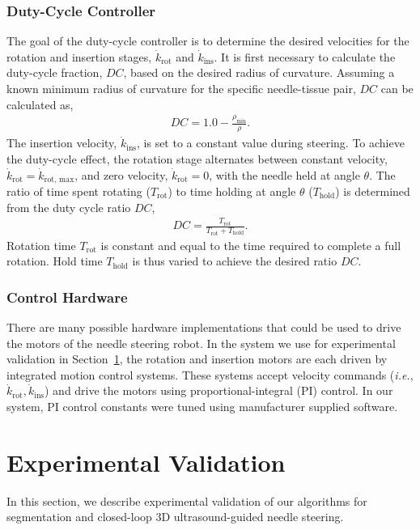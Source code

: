 \subsubsection{Duty-Cycle Controller}
The goal of the duty-cycle controller is to determine the desired velocities for the rotation and insertion stages, $\dot{k}_\text{rot}$ and $\dot{k}_\text{ins}$. It is first necessary to calculate the duty-cycle fraction, $DC$, based on the desired radius of curvature. Assuming a known minimum radius of curvature for the specific needle-tissue pair, $DC$ can be calculated as,
\begin{align}
DC = 1.0 - \frac{\rho_\text{min}}{\rho}. 
\label{eq:DC}
\end{align}
The insertion velocity, $\dot{k}_\text{ins}$, is set to a constant value during steering.  To achieve the duty-cycle effect, the rotation stage alternates between constant velocity, $\dot{k}_\text{rot} = \dot{k}_\text{rot, max}$, and zero velocity, $\dot{k}_\text{rot} = 0$, with the needle held at angle $\theta$. The ratio of time spent rotating ($T_\text{rot}$) to time holding at angle $\theta$ ($T_\text{hold}$) is determined from the duty cycle ratio $DC$,
\begin{align}
DC =\frac{T_\text{rot}}{T_\text{rot}+T_\text{hold}}.
\end{align}
Rotation time $T_\text{rot}$ is constant and equal to the time required to complete a full rotation. Hold time $T_\text{hold}$ is thus varied to achieve the desired ratio $DC$.

\subsubsection{Control Hardware}
There are many possible hardware implementations that could be used to drive the motors of the needle steering robot. In the system we use for experimental validation in Section~\ref{sec:ExperimentalValidation}, the rotation and insertion motors are each driven by integrated motion control systems. These systems accept velocity commands (\textit{i.e.}, $\dot{k}_\text{rot}, \dot{k}_\text{ins}$) and drive the motors using proportional-integral (PI) control. In our system, PI control constants were tuned using manufacturer supplied software.

\section{Experimental Validation}
\label{sec:ExperimentalValidation}
In this section, we describe experimental validation of our algorithms for segmentation and closed-loop 3D ultrasound-guided needle steering.
